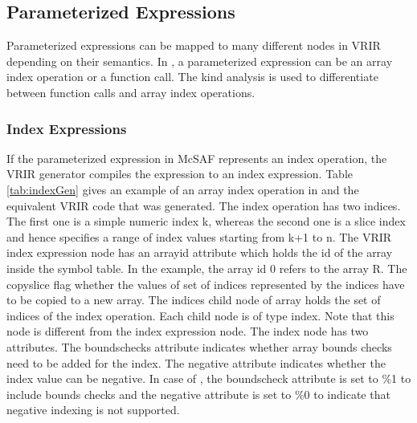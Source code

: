 \subsection{Parameterized Expressions}
\label{subsec:paramGen}
Parameterized expressions can be mapped to many different nodes in VRIR depending on their semantics. In \matlab, a parameterized expression can be an array index operation or a function call. The kind analysis\cite{Doherty:2011:KAM:2076021.2048077} is  used to differentiate between function calls and array index operations. 
\subsubsection{Index Expressions}
If the parameterized expression in McSAF represents an index operation, the VRIR generator compiles the expression to an index expression. Table \ref{tab:indexGen} gives an example of an array index operation in \matlab and the equivalent VRIR code that was generated. The index operation has two indices. The first one is a simple numeric index \textsf{k},  whereas the second one is a slice index and hence specifies a range of index values starting from \textsf{k+1} to \textsf{n}. The VRIR index expression node  has an \textsf{arrayid} attribute which holds the id of the array inside the symbol table. In the example, the array id 0 refers to the array R. The copyslice flag whether the values of set of indices represented by the indices have to be copied to a new array. The \textsf{indices} child node of array holds the set of indices of the index operation. Each child node is of type index. Note that this node is different from the index expression node. The index node has two attributes. The \textsf{boundschecks} attribute indicates whether array bounds checks need to be added for the index. The \textsf{negative} attribute indicates whether the index value can be negative. In case of \matlab, the \textsf{boundscheck} attribute  is set to \textsf{\%1} to include bounds checks and the \textsf{negative} attribute is set to \textsf{\%0} to indicate that negative indexing is not supported. 
